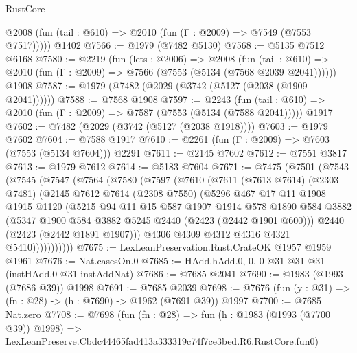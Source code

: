 \begin{lexlean}{RustCore}
\begin{coremodule}
      @2008 (fun (tail : @610) => @2010 (fun (Γ : @2009) => @7549 (@7553 @7517)))))
    @1402
@7566 := @1979 (@7482 @5130)
@7568 := @5135 @7512 @6168
@7580 := @2219
    (fun (lets : @2006) =>
    @2008
      (fun (tail : @610) => @2010 (fun (Γ : @2009) => @7566 (@7553 (@5134 (@7568 @2039 @2041))))))
    @1908
@7587 := @1979 (@7482 (@2029 (@3742 (@5127 (@2038 (@1909 @2041))))))
@7588 := @7568 @1908
@7597 := @2243
    (fun (tail : @610) => @2010 (fun (Γ : @2009) => @7587 (@7553 (@5134 (@7588 @2041)))))
    @1917
@7602 := @7482 (@2029 (@3742 (@5127 (@2038 @1918))))
@7603 := @1979 @7602
@7604 := @7588 @1917
@7610 := @2261 (fun (Γ : @2009) => @7603 (@7553 (@5134 @7604))) @2291
@7611 := @2145 @7602
@7612 := @7551 @3817
@7613 := @1979 @7612
@7614 := @5183 @7604
@7671 := @7475
    (@7501
      (@7543
        (@7545
          (@7547
            (@7564
              (@7580
                (@7597
                  (@7610
                    (@7611
                      (@7613 @7614)
                      (@2303 @7481)
                      (@2145
                        @7612
                        @7614
                        (@2308 @7550)
                        (@5296
                          @467
                          @17
                          @11
                          @1908
                          @1915
                          @1120
                          (@5215
                            @94
                            @11
                            @15
                            @587
                            @1907
                            @1914
                            @578
                            @1890
                            @584
                            @3882
                            (@5347 @1900 @584 @3882 @5245 @2440 (@2423 (@2442 @1901 @600)))
                            @2440
                            (@2423 (@2442 @1891 @1907)))
                          @4306
                          @4309
                          @4312
                          @4316
                          @4321
                          @5410)))))))))))
@7675 := LexLeanPreservation.Rust.CrateOK @1957 @1959 @1961
@7676 := Nat.casesOn.{0}
@7685 := HAdd.hAdd.{0, 0, 0} @31 @31 @31 (instHAdd.{0} @31 instAddNat)
@7686 := @7685 @2041
@7690 := @1983 (@1993 (@7686 @39)) @1998
@7691 := @7685 @2039
@7698 := @7676 (fun (y : @31) => (fn : @28) -> (h : @7690) -> @1962 (@7691 @39)) @1997
@7700 := @7685 Nat.zero
@7708 := @7698
    (fun (fn : @28) =>
    fun (h : @1983 (@1993 (@7700 @39)) @1998) =>
    LexLeanPreserve.Cbdc44465fad413a333319c74f7ce3bed.R6.RustCore.fun0)

\end{coremodule}
\end{lexlean}
